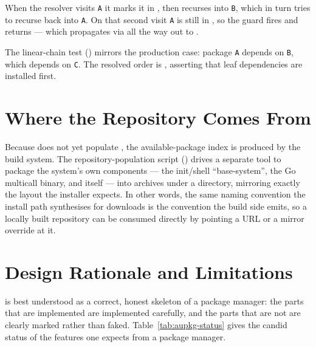 When the resolver visits \texttt{A} it marks it in , then recurses into \texttt{B}, which in turn tries to recurse back into \texttt{A}. On that second visit \texttt{A} is still in , so the  guard fires and returns  --- which propagates via  all the way out to .

The linear-chain test () mirrors the production case: package \texttt{A} depends on \texttt{B}, which depends on \texttt{C}. The resolved order is \code{[C, B, A]}, asserting that leaf dependencies are installed first.

\section{Where the Repository Comes From}

Because  does not yet populate , the available-package index is produced by the build system. The repository-population script () drives a separate  tool to package the system's own components --- the init/shell ``base-system'', the Go  multicall binary, and  itself --- into  archives under a  directory, mirroring exactly the  layout the installer expects. In other words, the same naming convention the install path synthesises for downloads is the convention the build side emits, so a locally built repository can be consumed directly by pointing a  URL or a mirror override at it.

\section{Design Rationale and Limitations}

 is best understood as a correct, honest skeleton of a package manager: the parts that are implemented are implemented carefully, and the parts that are not are clearly marked rather than faked. Table~\ref{tab:aupkg-status} gives the candid status of the features one expects from a package manager.

